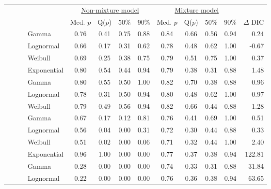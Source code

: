 \documentclass[12pt]{article}
\newif\ifdic   %
\begin{document}
\ifdic
\begin{table}[ht]\centering\small
\begin{tabular}{l|l|l|l|cccc|cccc||r}
 \multicolumn{4}{c|}{ } & \multicolumn{4}{c|}{\underline{Non-mixture model}} & \multicolumn{4}{c||}{\underline{Mixture model}} & \\
 \multicolumn{4}{c|}{ } & Med. $p$ & Q($p$) & 50\% & 90\% & Med. $p$ & Q($p$) & 50\% & 90\% & $\Delta$ DIC \\ 
  \hline
  \hline
 \parbox[t]{2mm}{} & \parbox[t]{2mm}{} & \parbox[t]{2mm}{} & Gamma & 0.76 & 0.41 & 0.75 & 0.88 & 0.84 & 0.66 & 0.56 & 0.94 & 0.24 \\ 
 & & &   Lognormal & 0.66 & 0.17 & 0.31 & 0.62 & 0.78 & 0.48 & 0.62 & 1.00 & -0.67 \\ 
 & & &   Weibull & 0.69 & 0.25 & 0.38 & 0.75 & 0.79 & 0.51 & 0.75 & 1.00 & 0.37 \\ 
 & & &   Exponential & 0.80 & 0.54 & 0.44 & 0.94 & 0.79 & 0.38 & 0.31 & 0.88 & 1.48 \\ 
 & & \parbox[t]{2mm}{} &  Gamma & 0.80 & 0.55 & 0.50 & 1.00 & 0.82 & 0.70 & 0.38 & 0.88 & 0.96 \\ 
 & & &   Lognormal & 0.78 & 0.31 & 0.50 & 0.94 & 0.80 & 0.48 & 0.62 & 1.00 & 0.97 \\ 
 & & &   Weibull & 0.79 & 0.49 & 0.56 & 0.94 & 0.82 & 0.66 & 0.44 & 0.88 & 1.28 \\ 
& \parbox[t]{2mm}{} & \parbox[t]{2mm}{} & Gamma & 0.67 & 0.17 & 0.12 & 0.81 & 0.76 & 0.41 & 0.69 & 1.00 & 0.51 \\ 
 & & &   Lognormal & 0.56 & 0.04 & 0.00 & 0.31 & 0.72 & 0.30 & 0.44 & 0.88 & 0.33 \\ 
 & & &   Weibull & 0.51 & 0.02 & 0.00 & 0.06 & 0.71 & 0.32 & 0.44 & 1.00 & 2.40 \\ 
 & & &   Exponential & 0.96 & 1.00 & 0.00 & 0.00 & 0.77 & 0.37 & 0.38 & 0.94 & 122.81 \\ 
 & & \parbox[t]{2mm}{} & Gamma & 0.28 & 0.00 & 0.00 & 0.00 & 0.74 & 0.33 & 0.31 & 0.88 & 31.84 \\ 
 & & &   Lognormal & 0.22 & 0.00 & 0.00 & 0.00 & 0.76 & 0.36 & 0.38 & 0.94 & 63.65 \\ 

\end{tabular}
\end{table}
\end{document}

